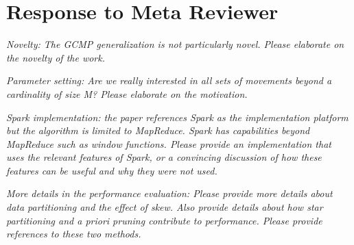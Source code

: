\section{Response to Meta Reviewer}

\emph{Novelty: The GCMP generalization is not particularly novel. Please elaborate on the novelty of the work.}


\emph{Parameter setting: Are we really interested in all sets of movements beyond a cardinality of size M? Please elaborate
on the motivation.}


\emph{Spark implementation: the paper references Spark as the implementation platform but the algorithm is limited to MapReduce. Spark has capabilities beyond MapReduce such as window functions. Please provide an implementation that uses the relevant features of Spark, or a convincing discussion of how these features can be useful and why they were not used.}


\emph{More details in the performance evaluation: Please provide more details about data partitioning and the effect of skew. Also provide details about how star partitioning and a priori pruning contribute to performance. Please provide references to these two methods.}


